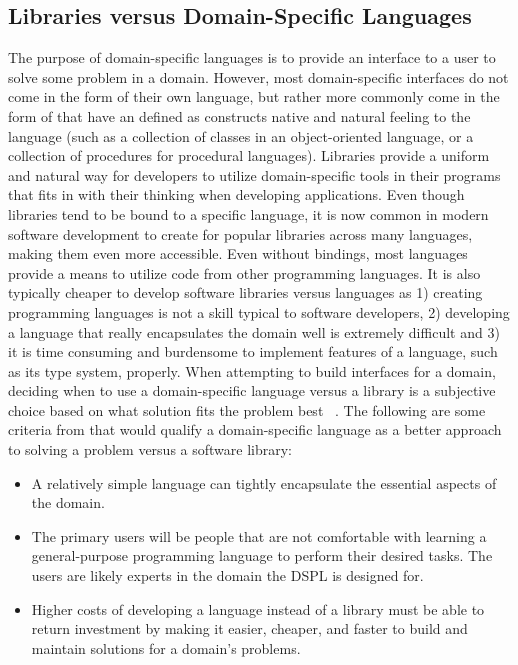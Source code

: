\subsection{Libraries versus Domain-Specific Languages}
The purpose of domain-specific languages is to provide an interface to a user to solve some problem in a domain. However, most domain-specific interfaces do not come in the form of their own language, but rather more commonly come in the form of  that have an  defined as constructs native and natural feeling to the language (such as a collection of classes in an object-oriented language, or a collection of procedures for procedural languages). Libraries provide a uniform and natural way for developers to utilize domain-specific tools in their programs that fits in with their thinking when developing applications. Even though libraries tend to be bound to a specific language, it is now common in modern software development to create  for popular libraries across many languages, making them even more accessible. Even without bindings, most languages provide a means to utilize code from other programming languages. It is also typically cheaper to develop software libraries versus languages as 1) creating programming languages is not a skill typical to software developers, 2) developing a language that really encapsulates the domain well is extremely difficult and 3) it is time consuming and burdensome to implement features of a language, such as its type system, properly. When attempting to build interfaces for a domain, deciding when to use a domain-specific language versus a library is a subjective choice based on what solution fits the problem best ~\citep{heering:dslsoftwareeng,mernik:whenhowdsl}. The following are some criteria from \citet{mernik:whenhowdsl} that would qualify a domain-specific language as a better approach to solving a problem versus a software library:
\begin{itemize}
\item A relatively simple language can tightly encapsulate the essential aspects of the domain.
\item The primary users will be people that are not comfortable with learning a general-purpose programming language to perform their desired tasks. The users are likely experts in the domain the DSPL is designed for.
\item Higher costs of developing a language instead of a library must be able to return investment by making it easier, cheaper, and faster to build and maintain solutions for a domain's problems.
\end{itemize}
